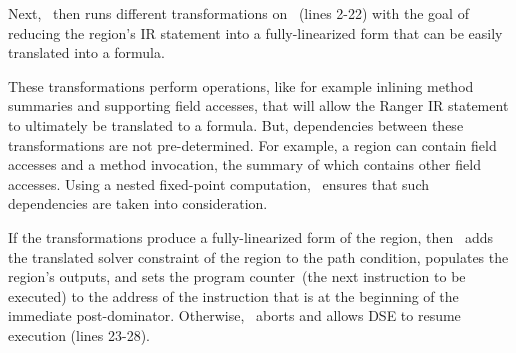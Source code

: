 Next, \tool\ then runs different transformations on \region\ (lines 2-22) with the goal of reducing the region\rq s
IR statement into a fully-linearized form that can be easily translated into a formula. 

These transformations perform operations, like for example inlining method summaries and supporting field
accesses, that will allow the Ranger IR statement to ultimately be translated to a formula.
%
But, dependencies between these transformations are not pre-determined.
%
For example, a region can contain field accesses and a method invocation, the summary of which contains other field
accesses.
%
Using a nested fixed-point computation, \toolshort\ ensures that such dependencies are taken into
consideration.

If the transformations produce a fully-linearized form of the region, then \tool\ adds the translated solver constraint of the region
to the path condition, populates the region\rq s outputs, and sets the program counter~(the next instruction to be
executed) to the address of the instruction that is at the beginning of the immediate post-dominator.
%
Otherwise, \toolshort\ aborts and allows DSE to resume execution (lines 23-28).
%
%

